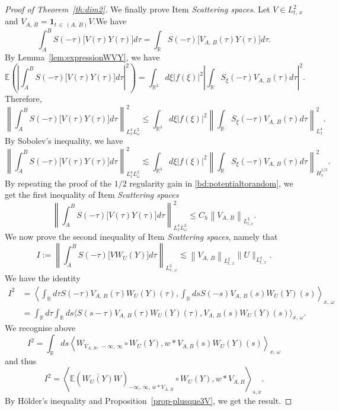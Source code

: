 \documentclass[AHL, Unicode, longabstracts,published]{cedram}
\newcommand{\R}{\mathbb{R}}
\newcommand{\E}{\mathbb{E}}
\newcommand{\bfun}{\mathbf{1}}
\begin{document}
\begin{proof}[Proof of Theorem~\ref{th:dim2}]
We finally prove Item \emph{Scattering spaces}. Let $V \in L^2_{t,\,x}$ and $V_{A,\,B} = \bfun_{t\,\in\,(A,\,B)} V$.\linebreak We have
\[
\int_{A}^B S(-\tau) \big[V(\tau) Y(\tau)\big] d\tau = \int_{\R} S(-\tau) \big[V_{A,\,B}(\tau) Y(\tau)\big] d\tau.
\]
By Lemma~\ref{lem:expressionWVY}, we have
\[
\E \left(\left|\int_{A}^B S(-\tau) \big[V(\tau) Y(\tau)\big] d\tau\right|^2\right) = \int_{\R^3} d\xi |f(\xi)|^2 \left|\int_{\R} S_\xi(-\tau) V_{A,\,B}(\tau)d\tau \right|^2.
\]
Therefore,
\[
\left\| \int_{A}^B S(-\tau) \big[V(\tau) Y(\tau)\big] d\tau\right\|_{L^4_x L^2_\omega}^2 \leq \int_{\R^3} d\xi |f(\xi)|^2 \left\| \int_{\R} S_\xi(-\tau) V_{A,\,B}(\tau)d\tau\right\|_{L^4_x}^2.
\]
By Sobolev's inequality, we have
\[
\left\| \int_{A}^B S(-\tau) \big[V(\tau) Y(\tau)\big] d\tau\right\|_{L^4_x L^2_\omega}^2 \lesssim \int_{\R^3} d\xi |f(\xi)|^2 \left\| \int_{\R} S_\xi(-\tau) V_{A,\,B}(\tau)d\tau\right\|_{\dot H^{1/2}_x}^2.
\]
By repeating the proof of the $1/2$ regularity gain in \eqref{bd:potentialtorandom}, we get the first inequality of Item \emph{Scattering spaces}
\[
\left\| \int_{A}^B S(-\tau) \big[V(\tau) Y(\tau)\big] d\tau\right\|_{L^4_x L^2_\omega}^2 \leq C_h \left\|V_{A,\,B}\right\|_{L^2_{t,x}}.
\]
We now prove the second inequality of Item \emph{Scattering spaces}, namely that
\[
I := \left\|\int_{A}^B S(-\tau) \big[V W_U(Y)\big] d\tau \right\|_{L^2_{x,\,\omega}} \lesssim \left\|V_{A,\,B}\right\|_{L^2_{t,\,x}} \|U\|_{L^2_{t,\,x}}.
\]
We have the identity
\begin{align*} 
I^2 &=\left\langle\int_{\R} d\tau S(-\tau) V_{A,\,B} (\tau) W_U(Y)(\tau), \int_{\R} ds S(-s)V_{A,\,B}(s) W_U(Y)(s)\right\rangle_{x,\,\omega}\\
& = \int_{\R} d\tau \int_{\R} ds \big\langle S(s-\tau) V_{A,\,B}(\tau)W_U(Y) (\tau), V_{A,\,B}(s) W_U(Y)(s)\big\rangle_{x,\,\omega}.
\end{align*}
We recognise above
\[
I^2 = \int_{\R} ds \left\langle W_{V_{A,\,B},\,-\infty,\,\infty} \circ W_U(Y), w*V_{A,B}(s) W_U(Y)(s)\right\rangle_{x,\,\omega}
\]
and thus
\[
I^2 = \left\langle\E\left(\overline{W_U(Y)}W\right)_{-\infty,\,\infty,\,w*V_{A,\,B}} \circ W_U(Y), w*V_{A,B}\right\rangle_{s,x}.
\]
By H\"older's inequality and Proposition~\ref{prop-plusque3V}, we get the result.
\end{proof}
\end{document}
